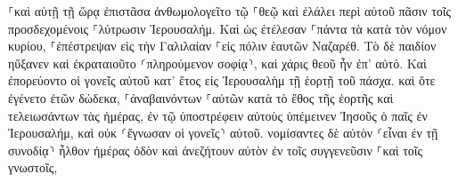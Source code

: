 \documentclass{openreader}
\begin{document}
⸀καὶ αὐτῇ τῇ ὥρᾳ ἐπιστᾶσα ἀνθωμολογεῖτο τῷ ⸀θεῷ καὶ ἐλάλει περὶ αὐτοῦ πᾶσιν τοῖς προσδεχομένοις ⸀λύτρωσιν Ἰερουσαλήμ. 
Καὶ ὡς ἐτέλεσαν ⸀πάντα τὰ κατὰ τὸν νόμον κυρίου, ⸀ἐπέστρεψαν εἰς τὴν Γαλιλαίαν ⸀εἰς πόλιν ἑαυτῶν Ναζαρέθ. 
Τὸ δὲ παιδίον ηὔξανεν καὶ ἐκραταιοῦτο ⸂πληρούμενον σοφίᾳ⸃, καὶ χάρις θεοῦ ἦν ἐπ’ αὐτό. 
Καὶ ἐπορεύοντο οἱ γονεῖς αὐτοῦ κατ’ ἔτος εἰς Ἰερουσαλὴμ τῇ ἑορτῇ τοῦ πάσχα. 
καὶ ὅτε ἐγένετο ἐτῶν δώδεκα, ⸀ἀναβαινόντων ⸀αὐτῶν κατὰ τὸ ἔθος τῆς ἑορτῆς 
καὶ τελειωσάντων τὰς ἡμέρας, ἐν τῷ ὑποστρέφειν αὐτοὺς ὑπέμεινεν Ἰησοῦς ὁ παῖς ἐν Ἰερουσαλήμ, καὶ οὐκ ⸂ἔγνωσαν οἱ γονεῖς⸃ αὐτοῦ. 
νομίσαντες δὲ αὐτὸν ⸂εἶναι ἐν τῇ συνοδίᾳ⸃ ἦλθον ἡμέρας ὁδὸν καὶ ἀνεζήτουν αὐτὸν ἐν τοῖς συγγενεῦσιν ⸀καὶ τοῖς γνωστοῖς, 
\end{document}
